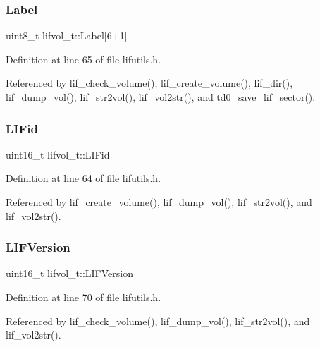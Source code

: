 \subsubsection{\texorpdfstring{Label}{Label}}
{\footnotesize\ttfamily uint8\+\_\+t lifvol\+\_\+t\+::\+Label\mbox{[}6+1\mbox{]}}



Definition at line 65 of file lifutils.\+h.



Referenced by lif\+\_\+check\+\_\+volume(), lif\+\_\+create\+\_\+volume(), lif\+\_\+dir(), lif\+\_\+dump\+\_\+vol(), lif\+\_\+str2vol(), lif\+\_\+vol2str(), and td0\+\_\+save\+\_\+lif\+\_\+sector().

\mbox{\label{structlifvol__t_adb6a0c2fff5b765eb12c3eb5db6d5bad}} 
\subsubsection{\texorpdfstring{L\+I\+Fid}{LIFid}}
{\footnotesize\ttfamily uint16\+\_\+t lifvol\+\_\+t\+::\+L\+I\+Fid}



Definition at line 64 of file lifutils.\+h.



Referenced by lif\+\_\+create\+\_\+volume(), lif\+\_\+dump\+\_\+vol(), lif\+\_\+str2vol(), and lif\+\_\+vol2str().

\mbox{\label{structlifvol__t_afffd824a7b0ce6aa8410fa243733475f}} 
\subsubsection{\texorpdfstring{L\+I\+F\+Version}{LIFVersion}}
{\footnotesize\ttfamily uint16\+\_\+t lifvol\+\_\+t\+::\+L\+I\+F\+Version}



Definition at line 70 of file lifutils.\+h.



Referenced by lif\+\_\+check\+\_\+volume(), lif\+\_\+dump\+\_\+vol(), lif\+\_\+str2vol(), and lif\+\_\+vol2str().

\mbox{\label{structlifvol__t_ad245f7419e180934262f53acd9b4349c}} 
